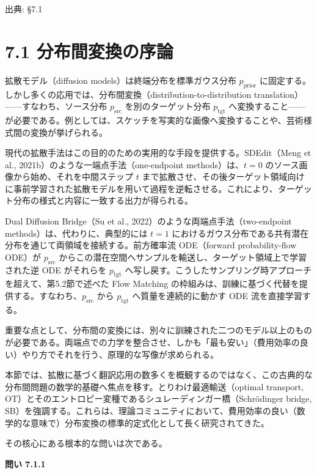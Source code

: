 

{\color{gray}\footnotesize 出典: §7.1\par}
\vspace{0.2em}

\section*{7.1 分布間変換の序論}


拡散モデル（diffusion models）は終端分布を標準ガウス分布 $p_{\mathrm{prior}}$ に固定する。しかし多くの応用では、分布間変換（distribution-to-distribution translation）——すなわち、ソース分布 $p_{\mathrm{src}}$ を別のターゲット分布 $p_{\mathrm{tgt}}$ へ変換すること——が必要である。例としては、スケッチを写実的な画像へ変換することや、芸術様式間の変換が挙げられる。

現代の拡散手法はこの目的のための実用的な手段を提供する。SDEdit（Meng et al., 2021b）のような一端点手法（one-endpoint methods）は、$t=0$ のソース画像から始め、それを中間ステップ $t$ まで拡散させ、その後ターゲット領域向けに事前学習された拡散モデルを用いて過程を逆転させる。これにより、ターゲット分布の様式と内容に一致する出力が得られる。

Dual Diffusion Bridge（Su et al., 2022）のような両端点手法（two-endpoint methods）は、代わりに、典型的には $t=1$ におけるガウス分布である共有潜在分布を通じて両領域を接続する。前方確率流 ODE（forward probability-flow ODE）が $p_{\mathrm{src}}$ からこの潜在空間へサンプルを輸送し、ターゲット領域上で学習された逆 ODE がそれらを $p_{\mathrm{tgt}}$ へ写し戻す。こうしたサンプリング時アプローチを超えて、第5.2節で述べた Flow Matching の枠組みは、訓練に基づく代替を提供する。すなわち、$p_{\mathrm{src}}$ から $p_{\mathrm{tgt}}$ へ質量を連続的に動かす ODE 流を直接学習する。

重要な点として、分布間の変換には、別々に訓練された二つのモデル以上のものが必要である。両端点での力学を整合させ、しかも「最も安い」（費用効率の良い）やり方でそれを行う、原理的な写像が求められる。

本節では、拡散に基づく翻訳応用の数多くを概観するのではなく、この古典的な分布間問題の数学的基礎へ焦点を移す。とりわけ最適輸送（optimal transport, OT）とそのエントロピー変種であるシュレーディンガー橋（Schrödinger bridge, SB）を強調する。これらは、理論コミュニティにおいて、費用効率の良い（数学的な意味で）分布変換の標準的定式化として長く研究されてきた。

その核心にある根本的な問いは次である。

\textbf{問い 7.1.1}


